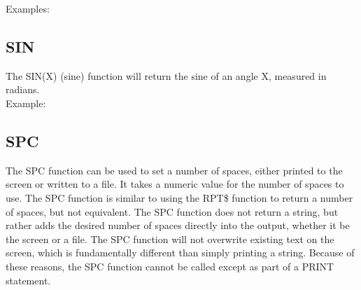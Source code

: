 Examples:\\


\subsection{SIN}

The {\ttfamily SIN(X)} (sine) function will return the sine of an angle
{\ttfamily X}, measured in radians.\\

Example:\\


\subsection{SPC}

The {\ttfamily SPC} function can be used to set a number of spaces, either
printed to the screen or written to a file.  It takes a numeric value for the
number of spaces to use.  The {\ttfamily SPC} function is similar to using the
{\ttfamily RPT\$} function to return a number of spaces, but not equivalent.
The {\ttfamily SPC} function does not return a string, but rather adds the
desired number of spaces directly into the output, whether it be the screen or
a file.  The {\ttfamily SPC} function will not overwrite existing text on the
screen, which is fundamentally different than simply printing a string.
Because of these reasons, the {\ttfamily SPC} function cannot be called except
as part of a {\ttfamily PRINT} statement.\\

